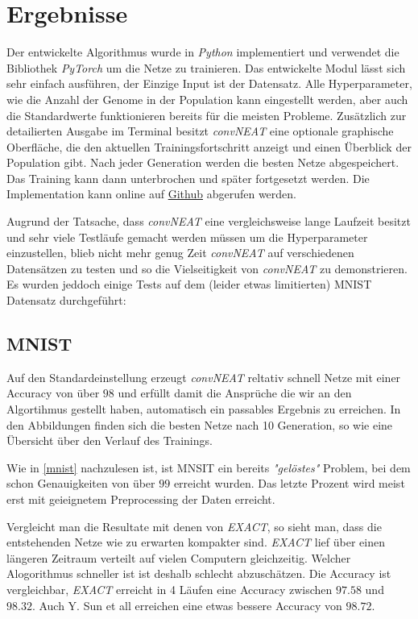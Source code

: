 \documentclass[]{scrartcl}
\begin{document}
	\section{Ergebnisse}\label{ergeb}
		
		Der entwickelte Algorithmus wurde in \textit{Python} implementiert und verwendet die Bibliothek \textit{PyTorch} um die Netze zu trainieren.
		Das entwickelte Modul lässt sich sehr einfach ausführen, der Einzige Input ist der Datensatz. 
		Alle Hyperparameter, wie die Anzahl der Genome in der Population kann eingestellt werden, aber auch die Standardwerte funktionieren bereits für die meisten Probleme.
		Zusätzlich zur detailierten Ausgabe im Terminal besitzt \textit{convNEAT} eine optionale graphische Oberfläche, die den aktuellen Trainingsfortschritt anzeigt und einen Überblick der Population gibt.
		Nach jeder Generation werden die besten Netze abgespeichert. Das Training kann dann unterbrochen und später fortgesetzt werden.
		Die Implementation kann online auf \href{https://github.com/Jukamala/convNEAT}{Github} abgerufen werden.

		Augrund der Tatsache, dass \textit{convNEAT} eine vergleichsweise lange Laufzeit besitzt und sehr viele Testläufe gemacht werden müssen um die Hyperparameter einzustellen, blieb nicht mehr genug Zeit
		\textit{convNEAT} auf verschiedenen Datensätzen zu testen und so die Vielseitigkeit von \textit{convNEAT} zu demonstrieren.
		Es wurden jeddoch einige Tests auf dem (leider etwas limitierten) MNIST Datensatz durchgeführt:

		\subsection{MNIST}
			
			Auf den Standardeinstellung erzeugt \textit{convNEAT} reltativ schnell Netze mit einer Accuracy von über $98$ und erfüllt damit die Ansprüche die wir an
			den Algortihmus gestellt haben, automatisch ein passables Ergebnis zu erreichen.
			In den Abbildungen finden sich die besten Netze nach 10 Generation, so wie eine Übersicht über den Verlauf des Trainings.


			Wie in \ref{mnist} nachzulesen ist, ist MNSIT ein bereits \textit{"gelöstes"} Problem, bei dem schon Genauigkeiten von über $99$ erreicht wurden.
			Das letzte Prozent wird meist erst mit geieignetem Preprocessing der Daten erreicht.

			Vergleicht man die Resultate mit denen von \textit{EXACT}, so sieht man, dass die entstehenden Netze wie zu erwarten kompakter sind.
			\textit{EXACT} lief über einen längeren Zeitraum verteilt auf vielen Computern gleichzeitig.
			Welcher Alogorithmus schneller ist ist deshalb schlecht abzuschätzen.
			Die Accuracy ist vergleichbar, \textit{EXACT} erreicht in 4 Läufen eine Accuracy zwischen $97.58$ und $98.32$.
			Auch Y. Sun et all erreichen eine etwas bessere Accuracy von $98.72$.
\end{document}
